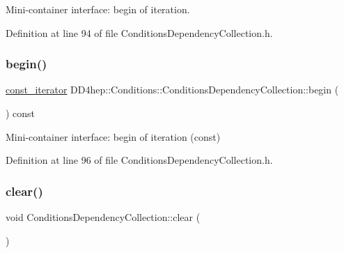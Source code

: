 Mini-\/container interface\+: begin of iteration. 



Definition at line 94 of file Conditions\+Dependency\+Collection.\+h.

\hypertarget{class_d_d4hep_1_1_conditions_1_1_conditions_dependency_collection_af54639de86e7de644ba5f4d50cf4a02a}{}\label{class_d_d4hep_1_1_conditions_1_1_conditions_dependency_collection_af54639de86e7de644ba5f4d50cf4a02a} 
\subsubsection{\texorpdfstring{begin()}{begin()}\hspace{0.1cm}{\footnotesize\ttfamily [2/2]}}
{\footnotesize\ttfamily \hyperlink{class_d_d4hep_1_1_conditions_1_1_conditions_dependency_collection_ab5e9bcdc3330c3b694303f627799dc84}{const\+\_\+iterator} D\+D4hep\+::\+Conditions\+::\+Conditions\+Dependency\+Collection\+::begin (\begin{DoxyParamCaption}{ }\end{DoxyParamCaption}) const\hspace{0.3cm}{\ttfamily [inline]}}



Mini-\/container interface\+: begin of iteration (const) 



Definition at line 96 of file Conditions\+Dependency\+Collection.\+h.

\hypertarget{class_d_d4hep_1_1_conditions_1_1_conditions_dependency_collection_ace3a46d90c1770071d31ae203dadf518}{}\label{class_d_d4hep_1_1_conditions_1_1_conditions_dependency_collection_ace3a46d90c1770071d31ae203dadf518} 
\subsubsection{\texorpdfstring{clear()}{clear()}}
{\footnotesize\ttfamily void Conditions\+Dependency\+Collection\+::clear (\begin{DoxyParamCaption}{ }\end{DoxyParamCaption})}



